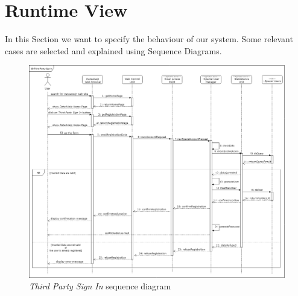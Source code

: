 \section{Runtime View}
In this Section we want to specify the behaviour of our system. Some relevant cases are selected and explained using Sequence Diagrams.

\begin{figure}[H]
  \begin{center}
  	\includegraphics[width=\textwidth]{./img/sequence/webSignIn.png}
    \hspace{0.05\linewidth}
    \centering
    \caption{\textit{Third Party Sign In} sequence diagram}
		\label{img:webSignIn}
    \end{center}
\end{figure}

